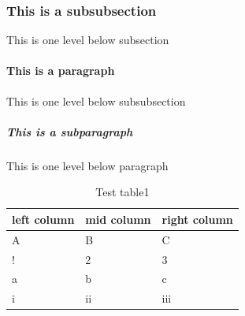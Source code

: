 \subsubsection{This is a subsubsection}
This is one level below subsection

\paragraph{This is a paragraph}
This is one level below subsubsection


\subparagraph{This is a subparagraph}
This is one level below paragraph

\begin{center}
\begin{table}[h]%
\centering
\begin{tabular}{lll}%
	\hline %
	\textbf{left column} & \textbf{mid column} & \textbf{right column} \\
	\hline
	A & B & C \\
	! & 2 & 3 \\
	a & b & c \\
	i & ii & iii \\
	\hline
\end{tabular}
\caption{Test table1}
\label{tab:threecols1}
\end{table}
\end{center}
    


